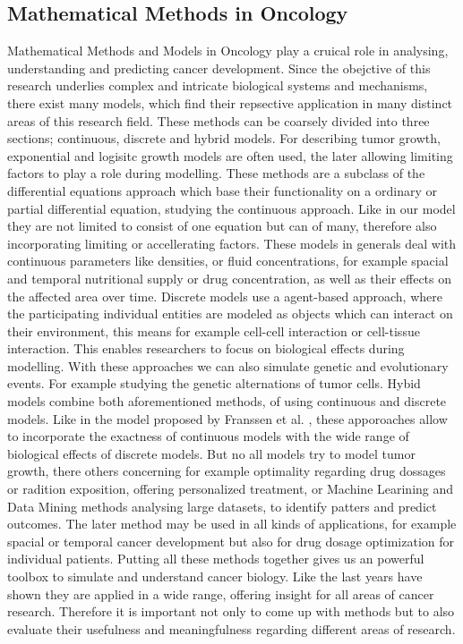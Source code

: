 \subsection{Mathematical Methods in Oncology}
Mathematical Methods and Models in Oncology play a cruical role in analysing, understanding and predicting cancer development. 
Since the obejctive of this research underlies complex and intricate biological systems and mechanisms, there exist many models, which find their repsective application in 
many distinct areas of this research field. These methods can be coarsely divided into three sections; continuous, discrete and hybrid models. 
For describing tumor growth, exponential and logisitc growth models are often used, the later allowing limiting factors to play a role during modelling.  
These methods are a subclass of the differential equations approach which base their functionality on a ordinary or partial differential equation, studying the continuous approach. 
Like in our model they are not limited to consist of one equation but can of many, therefore also incorporating limiting or accellerating factors. These models in generals deal with 
continuous parameters like densities, or fluid concentrations, for example spacial and temporal nutritional supply or drug concentration, as well as their effects on the affected area over time. 
Discrete models use a agent-based approach, where the participating individual entities are modeled as objects which can interact on their environment, this means for example cell-cell interaction or 
cell-tissue interaction. This enables researchers to focus on biological effects during modelling. With these approaches we can also simulate genetic and evolutionary events. For example studying the genetic alternations of tumor cells.\newline 
Hybid models combine both aforementioned methods, of using continuous and discrete models. Like in the model proposed by Franssen et al. \cite*{franssen_mathematical_2019}, these apporoaches allow to incorporate the exactness of continuous models with the wide range of biological effects of discrete models. \newline
But no all models try to model tumor growth, there others concerning for example optimality regarding drug dossages or radition exposition, offering personalized treatment, or Machine Learining and Data Mining methods analysing large datasets, to identify patters and predict outcomes. The later method may be used in all kinds of applications, for example spacial or temporal cancer development but also for drug dosage optimization for individual patients. 
Putting all these methods together gives us an powerful toolbox to simulate and understand cancer biology. Like the last years have shown they are applied in a wide range, offering insight for all areas of cancer research.
Therefore it is important not only to come up with methods but to also evaluate their usefulness and meaningfulness regarding different areas of research.